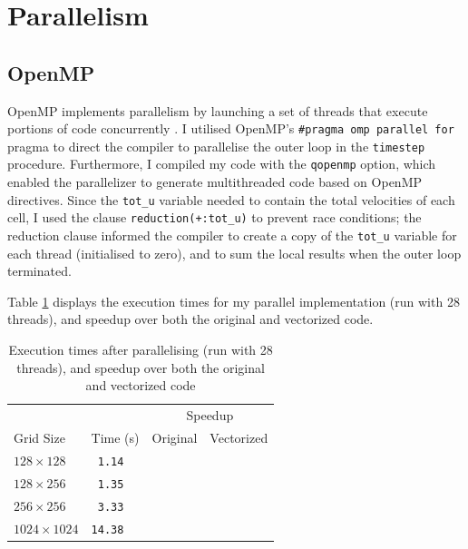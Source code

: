 \documentclass[twocolumn, a4paper]{article}
\begin{document}
\section{Parallelism}


\subsection{OpenMP}

OpenMP implements parallelism by launching a set of threads that execute portions of code concurrently \cite{openmp_cornell}.
I utilised OpenMP's \texttt{\#pragma omp parallel for} pragma to direct the compiler to parallelise the outer loop in the \texttt{timestep} procedure.
Furthermore, I compiled my code with the \texttt{qopenmp} option, which enabled the parallelizer to generate multithreaded code based on OpenMP directives.
Since the \texttt{tot\_u} variable needed to contain the total velocities of each cell, I used the clause \texttt{reduction(+:tot\_u)} to prevent race conditions; the reduction clause informed the compiler to create a copy of the \texttt{tot\_u} variable for each thread (initialised to zero), and to sum the local results when the outer loop terminated.

Table \ref{tab:parallelised} displays the execution times for my parallel implementation (run with 28 threads), and speedup over both the original and vectorized code.

\begin{table}[htbp]
  \begin{center}
  \caption{Execution times after parallelising (run with 28 threads), and speedup over both the original and vectorized code}\label{tab:parallelised}
  \begin{tabular}{l | l  l  l} 
      \hline\hline
      &&\multicolumn{2}{c}{Speedup}\\
      \cline{3-4}
      Grid Size&Time (s)&Original&Vectorized\\
      \hline
      $128 \times 128$&\texttt{ 1.14}&\texttt{}&\texttt{}\\
      $128 \times 256$&\texttt{ 1.35}&\texttt{}&\texttt{}\\
      $256 \times 256$&\texttt{ 3.33}&\texttt{}&\texttt{}\\
      $1024 \times 1024$&\texttt{14.38}&\texttt{}&\texttt{}\\
      \hline
    \end{tabular}
  \end{center}
\end{table}
\end{document}
